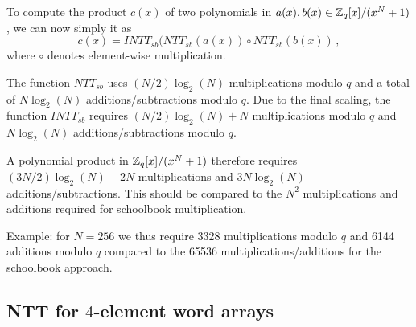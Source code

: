 \begin{algorithm}[!t] \label{algo:intt_sb}
\begin{scriptsize}
\caption{\emph{$INTT_{sb}$}}
\end{scriptsize}
\end{algorithm} 

To compute the product $c(x)$ of two polynomials in $a(x), b(x) \in \mathbb{Z}_q[x]/(x^N+1)$, we can now simply it as 
\[  c(x) = INTT_{sb}(NTT_{sb}(a(x)) \circ NTT_{sb}(b(x)) \, , \]
where $\circ$ denotes element-wise multiplication.

The function $NTT_{sb}$ uses $(N/2) \log_2(N)$ multiplications modulo $q$ and a total of $N \log_2(N)$ additions/subtractions modulo $q$.
Due to the final scaling, the function $INTT_{sb}$ requires $(N/2) \log_2(N) + N$ multiplications modulo $q$ and 
$N \log_2(N)$ additions/subtractions modulo $q$.

A polynomial product in $\mathbb{Z}_q[x]/(x^N+1)$ therefore requires $(3N/2) \log_2(N) + 2N$ multiplications and $3 N \log_2(N)$ 
additions/subtractions.  This should be compared to the $N^2$ multiplications and additions required for schoolbook multiplication.

Example: for $N = 256$ we thus require 3328 multiplications modulo $q$ and 6144 additions modulo $q$ compared to the 
65536 multiplications/additions for the schoolbook approach.

\subsection{NTT for $4$-element word arrays}

